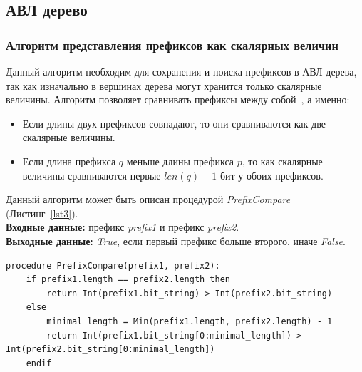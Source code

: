 \documentclass[9pt,a4paper]{article}
\begin{document}
        \subsection{АВЛ дерево}
            \subsubsection{Алгоритм представления префиксов как скалярных величин}
                Данный алгоритм необходим для сохранения и поиска префиксов в АВЛ дерева, так как изначально в вершинах дерева могут хранится только скалярные величины.
                Алгоритм позволяет сравнивать префиксы между собой~\cite{behdadfar2011coded}, а именно:
                \begin{itemize}
                    \item Если длины двух префиксов совпадают, то они сравниваются как две скалярные величины.
                    \item Если длина префикса $q$ меньше длины префикса $p$, то как скалярные величины сравниваются первые $len(q) - 1$ бит у обоих префиксов.
                \end{itemize}
                Данный алгоритм может быть описан процедурой \emph{PrefixCompare} (Листинг~\ref{lst3}).\\
                {\bf Входные данные:} префикс \emph{prefix1} и префикс \emph{prefix2}.\\
                {\bf Выходные данные:} \emph{True}, если первый префикс больше второго, иначе \emph{False}.
\\
\begin{lstlisting}[caption=Процедура сравнения префиксов как скалярных величин., label=lst3]
procedure PrefixCompare(prefix1, prefix2):
    if prefix1.length == prefix2.length then
        return Int(prefix1.bit_string) > Int(prefix2.bit_string)
    else
        minimal_length = Min(prefix1.length, prefix2.length) - 1
        return Int(prefix1.bit_string[0:minimal_length]) > Int(prefix2.bit_string[0:minimal_length])
    endif
\end{lstlisting}
\end{document}
